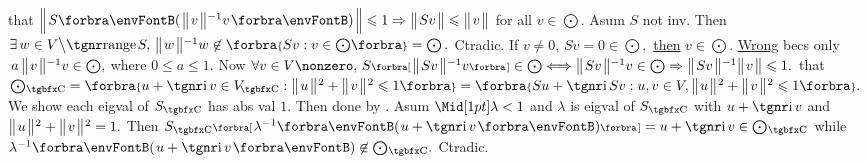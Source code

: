 \NOTICE that $\BigDvert{S\Par{\Dvert{v}{^{-1}}v}}\leqslant 1\Rightarrow\Dvert{Sv}\leqslant\Dvert{v}$ for all $v\in\bigodot.$\parSol{}
Asum $S$ not inv. Then $\exists\,w\in V\Backslash\range S,\,\Dvert{w}{^{-1}}w\not\in\Bra{Sv:v\in\bigodot\!}=\bigodot.$ Ctradic.\parSol{}
\ANote If $v\neq0,\,Sv=0\in\bigodot,$ \uline{then} $v\in\bigodot.$ \;\uline{Wrong} becs only $\,a\,\big\Vert\hspace{1pt}{}v{}\hspace{1pt}\big\Vert{^{-1}}v\in\bigodot,$ where $0\leqslant a\leqslant1.$\vspace{4pt}\parSol{}
Now $\forall v\in V\nonzero,\,S\Sbra{\Dvert{Sv}{^{-1}}v}\in\bigodot\Longleftrightarrow\Dvert{Sv}{^{-1}}v\in\bigodot\Rightarrow\Dvert{Sv}{^{-1}}\Dvert{v}\leqslant1.$\PfEnd\vspace{2pt}\parSol{}
\Or \NOTICE that \,$\bigodot{_{\!\Cbb}}=\Bra{u+\i\,v\in V_{\!\Cbb}:\Dvertsq{u}+\Dvertsq{v}\leqslant1}=\Bra{Su+\i\,Sv:u,v\in V,\Dvertsq{u}+\Dvertsq{v}\leqslant 1}.$\parSol{}
We show each eigval of $S_{\Cbb}$ has abs val $1.$ Then done by \TIPS.\parSol{}
Asum $\aMid{\lambda}<1$ and $\lambda$ is eigval of $S_{\Cbb}$ with $u+\i\,v$ and $\big\Vert\hspace{1pt}{}u{}\hspace{1pt}\big\Vert{\hspace{0.5pt}}{^2}+\big\Vert\hspace{1pt}{}v{}\hspace{1pt}\big\Vert{\hspace{0.5pt}}{^2}=1.$\parSol{}
Then $S_{\Cbb}\Sbra{\lambda^{-1}\Par{u+\i\,v}}=u+\i\,v\in\bigodot{_{\!\Cbb}}$ while $\lambda^{-1}\Par{u+\i\,v}\not\in\bigodot{_{\!\Cbb}}.$ Ctradic.\PfEnd
\SepLine\ChEnd

%
\pagebreak
{}

\vspace{6pt}

